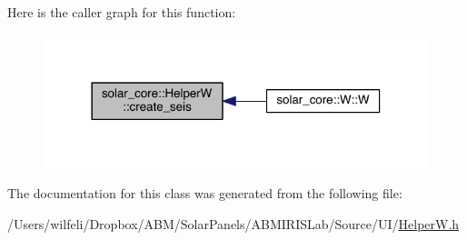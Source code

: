 Here is the caller graph for this function\+:
\nopagebreak
\begin{figure}[H]
\begin{center}
\leavevmode
\includegraphics[width=318pt]{classsolar__core_1_1_helper_w_a2d53e9a0f5945ced5ddc0388278d2336_icgraph}
\end{center}
\end{figure}




The documentation for this class was generated from the following file\+:\begin{DoxyCompactItemize}
\item 
/\+Users/wilfeli/\+Dropbox/\+A\+B\+M/\+Solar\+Panels/\+A\+B\+M\+I\+R\+I\+S\+Lab/\+Source/\+U\+I/\hyperlink{_helper_w_8h}{Helper\+W.\+h}\end{DoxyCompactItemize}
